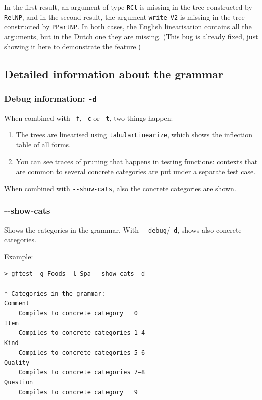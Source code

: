 In the first result, an argument of type \texttt{RCl} is missing in the
tree constructed by \texttt{RelNP}, and in the second result, the
argument \texttt{write\_V2} is missing in the tree constructed by
\texttt{PPartNP}. In both cases, the English linearisation contains all
the arguments, but in the Dutch one they are missing. (This bug is
already fixed, just showing it here to demonstrate the feature.)

\hypertarget{detailed-information-about-the-grammar}{%
\subsection{Detailed information about the
grammar}\label{detailed-information-about-the-grammar}}

\hypertarget{debug-information--d}{%
\subsubsection{\texorpdfstring{Debug information:
\texttt{-d}}{Debug information: -d}}\label{debug-information--d}}

When combined with \texttt{-f}, \texttt{-c} or \texttt{-t}, two things
happen:

\begin{enumerate}
\def\labelenumi{\arabic{enumi})}
\tightlist
\item
  The trees are linearised using \texttt{tabularLinearize}, which shows
  the inflection table of all forms.
\item
  You can see traces of pruning that happens in testing functions:
  contexts that are common to several concrete categories are put under
  a separate test case.
\end{enumerate}

When combined with \texttt{-\/-show-cats}, also the concrete categories
are shown.

\hypertarget{show-cats}{%
\subsubsection{-\/-show-cats}\label{show-cats}}

Shows the categories in the grammar. With
\texttt{-\/-debug}/\texttt{-d}, shows also concrete categories.

Example:

\begin{verbatim}
> gftest -g Foods -l Spa --show-cats -d

* Categories in the grammar:
Comment
    Compiles to concrete category   0
Item
    Compiles to concrete categories 1—4
Kind
    Compiles to concrete categories 5—6
Quality
    Compiles to concrete categories 7—8
Question
    Compiles to concrete category   9
\end{verbatim}

